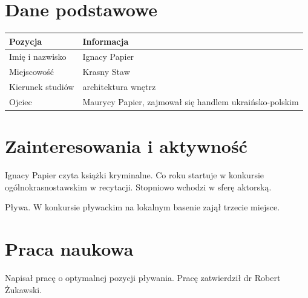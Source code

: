 \section*{Dane podstawowe}
\begin{tabularx}{\textwidth}{@{}lX@{}}
\toprule
\textbf{Pozycja} & \textbf{Informacja} \\
\midrule
Imię i nazwisko & Ignacy Papier \\
Miejscowość & Krasny Staw \\
Kierunek studiów & architektura wnętrz \\
Ojciec & Maurycy Papier, zajmował się handlem ukraińsko-polskim \\
\bottomrule
\end{tabularx}

\section*{Zainteresowania i aktywność}
Ignacy Papier czyta książki kryminalne. Co roku startuje w konkursie ogólnokrasnostawskim w recytacji. Stopniowo wchodzi w sferę aktorską.

Pływa. W konkursie pływackim na lokalnym basenie zajął trzecie miejsce.

\section*{Praca naukowa}
Napisał pracę o optymalnej pozycji pływania. Pracę zatwierdził dr Robert Żukawski.